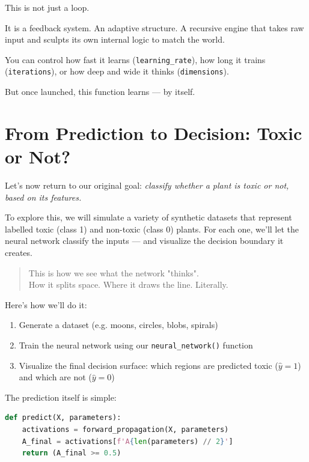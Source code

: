 \documentclass[11pt]{article}
\begin{document}
\bigskip

This is not just a loop.

It is a feedback system. An adaptive structure.  
A recursive engine that takes raw input and sculpts its own internal logic to match the world.

\medskip

\noindent
You can control how fast it learns (\texttt{learning\_rate}), how long it trains (\texttt{iterations}), or how deep and wide it thinks (\texttt{dimensions}).

But once launched, this function learns — by itself.


\section*{From Prediction to Decision: Toxic or Not?}

Let’s now return to our original goal:  
\textit{classify whether a plant is toxic or not, based on its features.}

\bigskip

To explore this, we will simulate a variety of synthetic datasets that represent labelled toxic (class 1) and non-toxic (class 0) plants.
For each one, we’ll let the neural network classify the inputs — and visualize the decision boundary it creates.

\begin{quote}
This is how we see what the network "thinks".\\
How it splits space. Where it draws the line. Literally.
\end{quote}

\bigskip

Here’s how we’ll do it:

\begin{enumerate}
  \item Generate a dataset (e.g. moons, circles, blobs, spirals)
  \item Train the neural network using our \texttt{neural\_network()} function
  \item Visualize the final decision surface: which regions are predicted toxic ($\hat{y} = 1$) and which are not ($\hat{y} = 0$)
\end{enumerate}

\medskip

The prediction itself is simple:

\vspace{0.5em}
\begin{lstlisting}[language=Python, frame=single, caption=Predicting class from probability, basicstyle=\ttfamily\small]
def predict(X, parameters):
    activations = forward_propagation(X, parameters)
    A_final = activations[f'A{len(parameters) // 2}']
    return (A_final >= 0.5)
\end{lstlisting}
\end{document}
